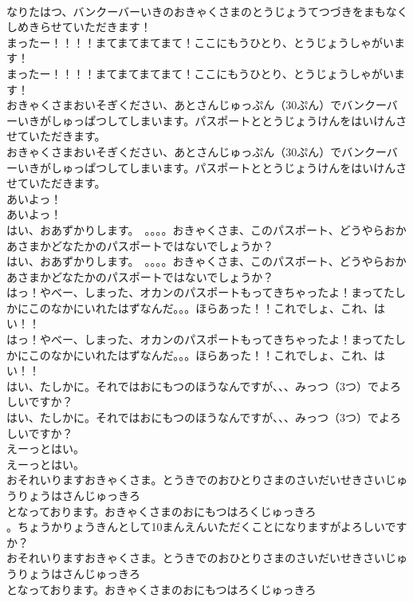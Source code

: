 \documentclass[8pt]{extreport}
\begin{document}
\begin{CJK}{UTF8}{min}
\\	なりたはつ、バンクーバーいきのおきゃくさまのとうじょうてつづきをまもなくしめきらせていただきます！ 
\\	まったー！！！！まてまてまてまて！ここにもうひとり、とうじょうしゃがいます！	
\\	まったー！！！！まてまてまてまて！ここにもうひとり、とうじょうしゃがいます！ 
\\	おきゃくさまおいそぎください、あとさんじゅっぷん（30ぷん）でバンクーバーいきがしゅっぱつしてしまいます。パスポートととうじょうけんをはいけんさせていただきます。	
\\	おきゃくさまおいそぎください、あとさんじゅっぷん（30ぷん）でバンクーバーいきがしゅっぱつしてしまいます。パスポートととうじょうけんをはいけんさせていただきます。 
\\	あいよっ！	
\\	あいよっ！ 
\\	はい、おあずかりします。　。。。。おきゃくさま、このパスポート、どうやらおかあさまかどなたかのパスポートではないでしょうか？	
\\	はい、おあずかりします。　。。。。おきゃくさま、このパスポート、どうやらおかあさまかどなたかのパスポートではないでしょうか？ 
\\	はっ！やべー、しまった、オカンのパスポートもってきちゃったよ！まってたしかにこのなかにいれたはずなんだ。。。ほらあった！！これでしょ、これ、はい！！	
\\	はっ！やべー、しまった、オカンのパスポートもってきちゃったよ！まってたしかにこのなかにいれたはずなんだ。。。ほらあった！！これでしょ、これ、はい！！ 
\\	はい、たしかに。それではおにもつのほうなんですが、、、みっつ（3つ）でよろしいですか？	
\\	はい、たしかに。それではおにもつのほうなんですが、、、みっつ（3つ）でよろしいですか？ 
\\	えーっとはい。	
\\	えーっとはい。 
\\	おそれいりますおきゃくさま。とうきでのおひとりさまのさいだいせきさいじゅうりょうはさんじゅっきろ
\\	となっております。おきゃくさまのおにもつはろくじゅっきろ
\\	。ちょうかりょうきんとして10まんえんいただくことになりますがよろしいですか？	
\\	おそれいりますおきゃくさま。とうきでのおひとりさまのさいだいせきさいじゅうりょうはさんじゅっきろ
\\	となっております。おきゃくさまのおにもつはろくじゅっきろ

\end{CJK}
\end{document}
